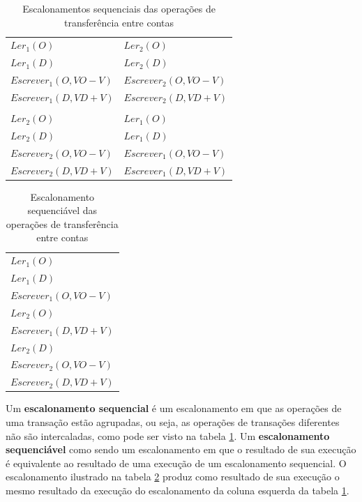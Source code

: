 \documentclass[11pt,twoside,a4paper]{book}
\begin{document}
\begin{table}
\caption{Escalonamentos sequenciais das operações de transferência entre contas}
\label{tab:escalonamento_sequencial}
\centering
\begin{tabular}{ | l | l | }
	\hline
	$Ler_1(O)$&$Ler_2(O)$\\
	$Ler_1(D)$&$Ler_2(D)$\\
	$Escrever_1(O, VO - V)$&$Escrever_2(O, VO - V)$\\
	$Escrever_1(D, VD + V)$&$Escrever_2(D, VD + V)$\\
	&\\
	$Ler_2(O)$&$Ler_1(O)$\\
	$Ler_2(D)$&$Ler_1(D)$\\
	$Escrever_2(O, VO - V)$&$Escrever_1(O, VO - V)$\\
	$Escrever_2(D, VD + V)$&$Escrever_1(D, VD + V)$\\
	\hline
\end{tabular}
\end{table}

\begin{table}
\caption{Escalonamento sequenciável das operações de transferência entre contas}
\label{tab:escalonamento_sequenciavel}
\centering
\begin{tabular}{ | l | }
	\hline
	$Ler_1(O)$\\
	$Ler_1(D)$\\
	$Escrever_1(O, VO - V)$\\
	$Ler_2(O)$\\
	$Escrever_1(D, VD + V)$\\
	$Ler_2(D)$\\
	$Escrever_2(O, VO - V)$\\
	$Escrever_2(D, VD + V)$\\
	\hline
\end{tabular}
\end{table}

Um \textbf{escalonamento sequencial} é um escalonamento em que as operações de uma transação estão agrupadas, ou seja, as operações de transações diferentes não são intercaladas, como pode ser visto na tabela \ref{tab:escalonamento_sequencial}. Um \textbf{escalonamento sequenciável} como sendo um escalonamento em que o resultado de sua execução é equivalente ao resultado de uma execução de um escalonamento sequencial. O escalonamento ilustrado na tabela \ref{tab:escalonamento_sequenciavel} produz como resultado de sua execução o mesmo resultado da execução do escalonamento da coluna esquerda da tabela \ref{tab:escalonamento_sequencial}.
\end{document}
